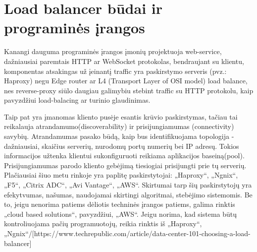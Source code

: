 \documentclass{VUMIFPSkursinis}
\begin{document}
\section{Load balancer būdai ir programinės įrangos}
Kanangi dauguma programinės įrangos įmonių projektuoja web-service, dažniausiai paremtais HTTP ar WebSocket protokolas, bendraujant su klientu, komponentas atsakingas už įeinantį traffic yra paskirstymo serveris (pvz.: Haproxy) negu Edge router ar L4 (Transport Layer of OSI model) load balance, nes reverse-proxy siūlo daugiau galimybiu stebint traffic su HTTP protokolu, kaip pavyzdžiui load-balacing ar turinio glaudinimas.

Taip pat yra įmanomas kliento pusėje esantis krūvio paskirstymas, tačiau tai reikalauja atrandamumo(discoverability) ir prisijungiamumas (connectivity) savybių. Atrandamumas pasako būdą, kaip bus identifikuojama topologija - dažniausiai, skaičius serverių, nurodomų portų numerių bei IP adresų. Tokios informacijos užtenka klientui sukonfiguruoti reikiama aplikacijos baseiną(pool). Prisijungiamumas parodo kliento gebėjimą tiesiogiai prisijungti prie tų serverių.
Plačiausiai šiuo metu rinkoje yra paplitę paskirstytojai: „Haproxy“, „Ngnix“, „F5“, „Citrix ADC“, „Avi Vantage“, „AWS“. Skirtumai tarp šių paskirstytojų yra efekytvumas, našumas, naudojamai skirtingi algoritmai, stebėjimo sistemomis. Be to, jeigu nenorima patiems dėliotis techninės įrangos patiems, galima rinktis „cloud based solutions“, pavyzdžiui, „AWS“. Jeigu norima, kad sistema būtų kontroliuojama pačių programuotojų, reikia rinktis iš „Haproxy“, „Ngnix“/[https://www.techrepublic.com/article/data-center-101-choosing-a-load-balancer]
\end{document}
